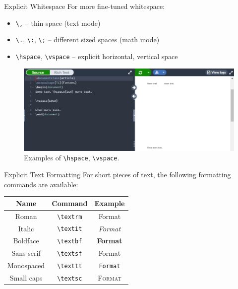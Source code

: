 \documentclass{beamer}
\begin{document}
{  \begin{frame}{Explicit Whitespace}
    For more fine-tuned whitespace:
    \begin{itemize}
      \item \texttt{\textbackslash,} -- thin space (text mode)
      \item \texttt{\textbackslash.}, \texttt{\textbackslash:}, \texttt{\textbackslash;} -- different sized spaces (math mode)
      \item \texttt{\textbackslash hspace}, \texttt{\textbackslash vspace} -- explicit horizontal, vertical space
    \end{itemize}
    \begin{figure}
      \includegraphics[width=0.8\linewidth]{day02-02B-explicit.png}
      \caption{Examples of \texttt{\textbackslash hspace}, \texttt{\textbackslash vspace}.}
      \label{fig:day02-02B}
    \end{figure}
  \end{frame}

  \begin{frame}{Explicit Text Formatting}
    For short pieces of text, the following formatting commands are available:
    \begin{table}
      \begin{tabular}{c|c|c}
        \textbf{Name} & \textbf{Command}               & \textbf{Example} \\ \hline
        Roman         & \texttt{\textbackslash textrm} & \textrm{Format} \\ \hline
        Italic        & \texttt{\textbackslash textit} & \textit{Format} \\ \hline
        Boldface      & \texttt{\textbackslash textbf} & \textbf{Format} \\ \hline
        Sans serif    & \texttt{\textbackslash textsf} & \textsf{Format} \\ \hline
        Monospaced    & \texttt{\textbackslash texttt} & \texttt{Format} \\ \hline
        Small caps    & \texttt{\textbackslash textsc} & \textsc{Format}
      \end{tabular}
    \end{table}
  \end{frame}

}
\end{document}
